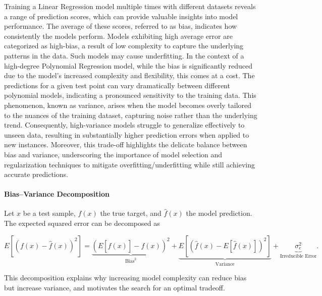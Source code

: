\documentclass{article}
\begin{document}
Training a Linear Regression model multiple times with different datasets reveals a range of prediction scores, which can provide valuable insights into model performance. The average of these scores, referred to as bias, indicates how consistently the models perform. Models exhibiting high average error are categorized as high-bias, a result of low complexity to capture the underlying patterns in the data. Such models may cause underfitting. In the context of a high-degree Polynomial Regression model, while the bias is significantly reduced due to the model's increased complexity and flexibility, this comes at a cost. The predictions for a given test point can vary dramatically between different polynomial models, indicating a pronounced sensitivity to the training data. This phenomenon, known as variance, arises when the model becomes overly tailored to the nuances of the training dataset, capturing noise rather than the underlying trend. Consequently, high-variance models struggle to generalize effectively to unseen data, resulting in substantially higher prediction errors when applied to new instances. Moreover, this trade-off highlights the delicate balance between bias and variance, underscoring the importance of model selection and regularization techniques to mitigate overfitting/underfitting while still achieving accurate predictions.


\paragraph{Bias–Variance Decomposition}

Let $x$ be a test sample, $f(x)$ the true target, and $\hat{f}(x)$ the model prediction.
The expected squared error can be decomposed as

\[
E[(f(x) - \hat{f}(x))^2]
= \underbrace{(E[\hat{f}(x)] - f(x))^2}_{\text{Bias}^2}
+ \underbrace{E[(\hat{f}(x) - E[\hat{f}(x)])^2]}_{\text{Variance}}
+ \underbrace{\sigma_e^2}_{\text{Irreducible Error}}.
\]

This decomposition explains why increasing model complexity can reduce bias
but increase variance, and motivates the search for an optimal tradeoff.

\end{document}
